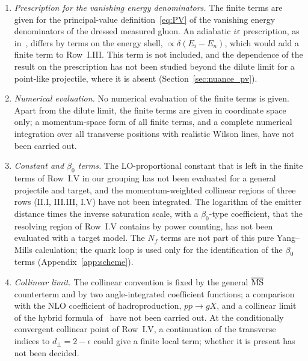 \begin{enumerate}
\item[(iii)] \emph{Prescription for the vanishing energy denominators.} The finite terms are given for the principal-value definition~\eqref{eq:PV} of the vanishing energy denominators of the dressed measured gluon. An adiabatic $i\varepsilon$ prescription, as in~\cite{Radhakrishnan:2026soft}, differs by terms on the energy shell, $\propto\delta(E_i-E_n)$, which would add a finite term to Row~I.III. This term is not included, and the dependence of the result on the prescription has not been studied beyond the dilute limit for a point-like projectile, where it is absent (Section~\ref{sec:nuance_pv}).
\item[(iv)] \emph{Numerical evaluation.} No numerical evaluation of the finite terms is given. Apart from the dilute limit, the finite terms are given in coordinate space only; a momentum-space form of all finite terms, and a complete numerical integration over all transverse positions with realistic Wilson lines, have not been carried out.
\item[(v)] \emph{Constant and $\beta_0$ terms.} The LO-proportional constant that is left in the finite terms of Row~I.V in our grouping has not been evaluated for a general projectile and target, and the momentum-weighted collinear regions of three rows (II.I, III.III, I.V) have not been integrated. The logarithm of the emitter distance times the inverse saturation scale, with a $\beta_0$-type coefficient, that the resolving region of Row~I.V contains by power counting, has not been evaluated with a target model. The $N_f$ terms are not part of this pure Yang--Mills calculation; the quark loop is used only for the identification of the $\beta_0$ terms (Appendix~\ref{app:scheme}).
\item[(vi)] \emph{Collinear limit.} The collinear convention is fixed by the general $\overline{\rm MS}$ counterterm and by two angle-integrated coefficient functions; a comparison with the NLO coefficient of hadroproduction, $pp\to gX$, and a collinear limit of the hybrid formula of~\cite{Chirilli:2012jd} have not been carried out. At the conditionally convergent collinear point of Row~I.V, a continuation of the transverse indices to $d_\perp=2-\epsilon$ could give a finite local term; whether it is present has not been decided.

\end{enumerate}

